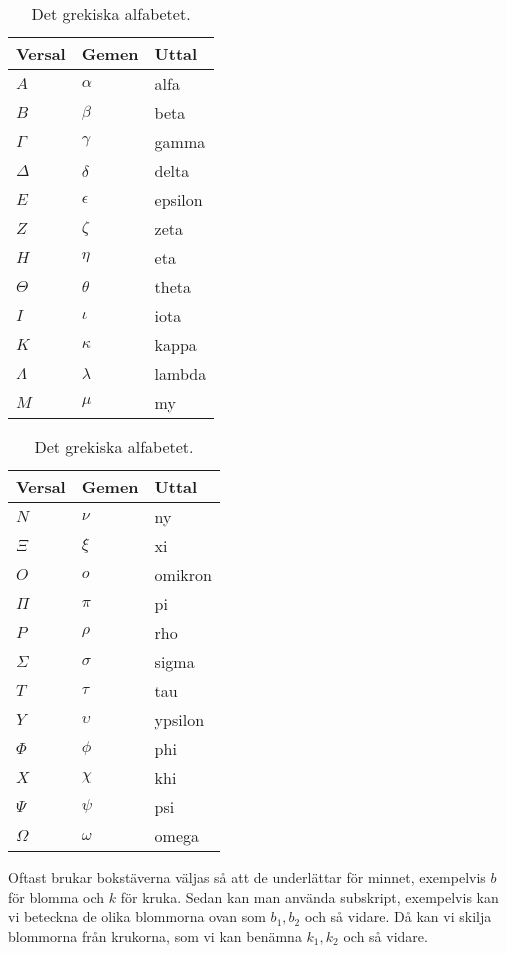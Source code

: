 \begin{table}
  \caption{Det grekiska alfabetet.}
  \begin{tabular}{lll}
    \textbf{Versal} & \textbf{Gemen} & \textbf{Uttal} \\
    \toprule
    \(A\) & \(\alpha\) & alfa \\
    \(B\) & \(\beta\) & beta \\
    \(\Gamma\) & \(\gamma\) & gamma \\
    \(\Delta\) & \(\delta\) & delta \\
    \(E\) & \(\epsilon\) & epsilon \\
    \(Z\) & \(\zeta\) & zeta \\
    \(H\) & \(\eta\) & eta \\
    \(\Theta\) & \(\theta\) & theta \\
    \(I\) & \(\iota\) & iota \\
    \(K\) & \(\kappa\) & kappa \\
    \(\Lambda\) & \(\lambda\) & lambda \\
    \(M\) & \(\mu\) & my \\
    \bottomrule
  \end{tabular}
  \hspace{1em}
  \begin{tabular}{lll}
    \textbf{Versal} & \textbf{Gemen} & \textbf{Uttal} \\
    \toprule
    \(N\) & \(\nu\) & ny \\
    \(\Xi\) & \(\xi\) & xi \\
    \(O\) & \(o\) & omikron \\
    \(\Pi\) & \(\pi\) & pi \\
    \(P\) & \(\rho\) & rho \\
    \(\Sigma\) & \(\sigma\) & sigma \\
    \(T\) & \(\tau\) & tau \\
    \(Y\) & \(\upsilon\) & ypsilon \\
    \(\Phi\) & \(\phi\) & phi \\
    \(X\) & \(\chi\) & khi \\
    \(\Psi\) & \(\psi\) & psi \\
    \(\Omega\) & \(\omega\) & omega \\
    \bottomrule
  \end{tabular}\label{tbl:greekalpha}
\end{table}

Oftast brukar bokstäverna väljas så att de underlättar för minnet, exempelvis 
\(b\) för blomma och \(k\) för kruka.
Sedan kan man använda subskript, exempelvis kan vi beteckna de olika blommorna 
ovan som \(b_1, b_2\) och så vidare.
Då kan vi skilja blommorna från krukorna, som vi kan benämna \(k_1, k_2\) och 
så vidare.


